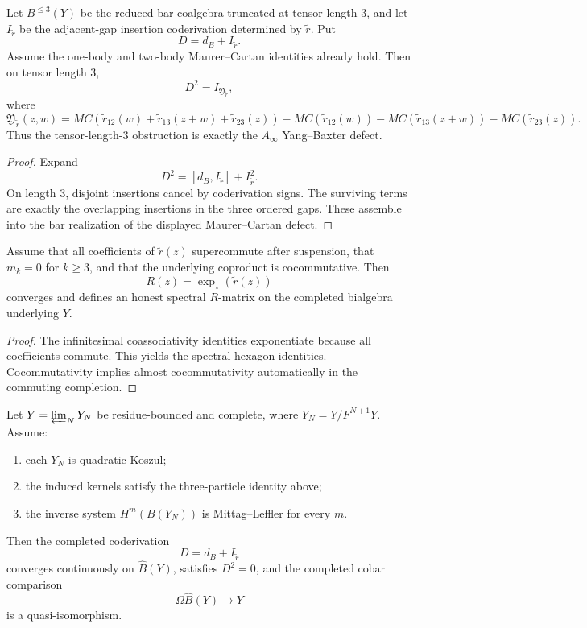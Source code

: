 \begin{proposition}
\ClaimStatusProvedHere
Let $B^{\le 3}(Y)$ be the reduced bar coalgebra truncated at tensor
length $3$, and let $I_{\widetilde r}$ be the adjacent-gap insertion
coderivation determined by $\widetilde r$. Put
\[
D=d_B+I_{\widetilde r}.
\]
Assume the one-body and two-body Maurer--Cartan identities already
hold. Then on tensor length $3$,
\[
D^2=I_{\mathfrak Y_{\widetilde r}},
\]
where
\[
\mathfrak Y_{\widetilde r}(z,w)=
MC(\widetilde r_{12}(w)+\widetilde r_{13}(z+w)+\widetilde r_{23}(z))
-MC(\widetilde r_{12}(w))
-MC(\widetilde r_{13}(z+w))
-MC(\widetilde r_{23}(z)).
\]
Thus the tensor-length-$3$ obstruction is exactly the
$A_\infty$ Yang--Baxter defect.
\end{proposition}

\begin{proof}
Expand
\[
D^2=[d_B,I_{\widetilde r}] + I_{\widetilde r}^2.
\]
On length $3$, disjoint insertions cancel by coderivation signs.
The surviving terms are exactly the overlapping insertions in the three
ordered gaps. These assemble into the bar realization of the displayed
Maurer--Cartan defect.
\end{proof}

\begin{theorem}
\ClaimStatusProvedHere
\label{thm:abelian-strictification}
Assume that all coefficients of $\widetilde r(z)$ supercommute after
suspension, that $m_k=0$ for $k\ge 3$, and that the underlying
coproduct is cocommutative. Then
\[
R(z)=\exp_\star(\widetilde r(z))
\]
converges and defines an honest spectral $R$-matrix on the completed
bialgebra underlying $Y$.
\end{theorem}

\begin{proof}
The infinitesimal coassociativity identities exponentiate because all
coefficients commute. This yields the spectral hexagon identities.
Cocommutativity implies almost cocommutativity automatically in the
commuting completion.
\end{proof}

\begin{theorem}
\ClaimStatusProvedHere
\label{thm:residue-bounded-completion}
Let $Y=\varprojlim_N Y_N$ be residue-bounded and complete, where
$Y_N=Y/F^{N+1}Y$. Assume:
\begin{enumerate}
\item each $Y_N$ is quadratic-Koszul;
\item the induced kernels satisfy the three-particle identity above;
\item the inverse system $H^m(B(Y_N))$ is Mittag--Leffler for every $m$.
\end{enumerate}
Then the completed coderivation
\[
D=d_B+I_{\widetilde r}
\]
converges continuously on $\widehat B(Y)$, satisfies $D^2=0$, and the
completed cobar comparison
\[
\Omega\widehat B(Y)\longrightarrow Y
\]
is a quasi-isomorphism.
\end{theorem}

